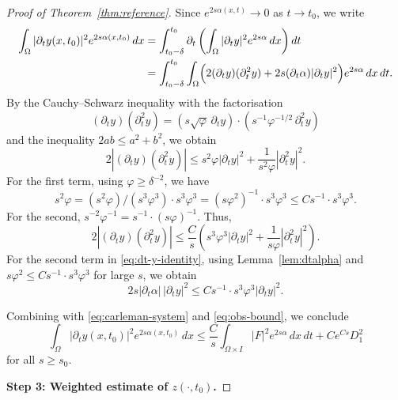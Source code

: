 \documentclass[12pt]{amsart}
\theoremstyle{plain}
\theoremstyle{definition}
\theoremstyle{remark}
\newcommand{\p}{\partial}
\newcommand{\Om}{\Omega}
\begin{document}
\begin{proof}[Proof of Theorem~\ref{thm:reference}]
Since $e^{2s\alpha(x,t)}\to0 $ as $ t\to t_0$, we write
\begin{align}
\int_\Om |\p_t y(x,t_0)|^2 e^{2s\alpha(x,t_0)}\,dx
&=\int_{t_0-\delta}^{t_0}\p_t\left(
\int_\Om |\p_t y|^2 e^{2s\alpha}\,dx\right)dt \notag\\
&=\int_{t_0-\delta}^{t_0}\int_\Om
\Bigl(2(\p_t y)(\p_t^2 y)+2s(\p_t\alpha)|\p_t y|^2\Bigr)
e^{2s\alpha}\,dx\,dt.
\label{eq:dt-y-identity}
\end{align}
By the Cauchy--Schwarz inequality with the factorisation
$$(\p_t y)(\p_t^2 y)=
(s\sqrt\varphi\,\p_t y)\cdot(s^{-1}\varphi^{-1/2}\,\p_t^2 y)$$
and the inequality $2ab\le a^2+b^2$, we obtain
\begin{equation}\label{eq:young-dty}
2|(\p_t y)(\p_t^2 y)|
\le s^2\varphi|\p_t y|^2+\frac{1}{s^2\varphi}|\p_t^2 y|^2.
\end{equation}
For the first term, using $\varphi\ge\delta^{-2}$, we have
$$s^2\varphi = (s^2\varphi)/(s^3\varphi^3)\cdot s^3\varphi^3
= (s\varphi^2)^{-1}\cdot s^3\varphi^3
\le C s^{-1}\cdot s^3\varphi^3.$$
For the second,
$s^{-2}\varphi^{-1}=s^{-1}\cdot(s\varphi)^{-1}$.
Thus,
\begin{equation}\label{eq:young-dty-final}
2|(\p_t y)(\p_t^2 y)|
\le \frac{C}{s}\left(s^3\varphi^3|\p_t y|^2
+\frac{1}{s\varphi}|\p_t^2 y|^2\right).
\end{equation}
For the second term in \eqref{eq:dt-y-identity}, using
Lemma~\ref{lem:dtalpha} and
$s\varphi^2\le Cs^{-1}\cdot s^3\varphi^3$ for large $s$, we obtain
$$2s|\p_t\alpha|\,|\p_t y|^2\le Cs^{-1}\cdot s^3\varphi^3|\p_t y|^2.$$

Combining with \eqref{eq:carleman-system} and \eqref{eq:obs-bound}, we
conclude
\begin{equation}\label{eq:dt-y-final}
\int_\Om |\p_t y(x,t_0)|^2 e^{2s\alpha(x,t_0)}\,dx
\le \frac{C}{s}\int_{\Om\times I}|F|^2 e^{2s\alpha}\,dx\,dt
+ C e^{Cs} D_1^2
\end{equation}
for all $s\ge s_0$.

\medskip
\noindent\textbf{Step 3: Weighted estimate of $z(\cdot,t_0)$.}


\end{proof}
\end{document}
